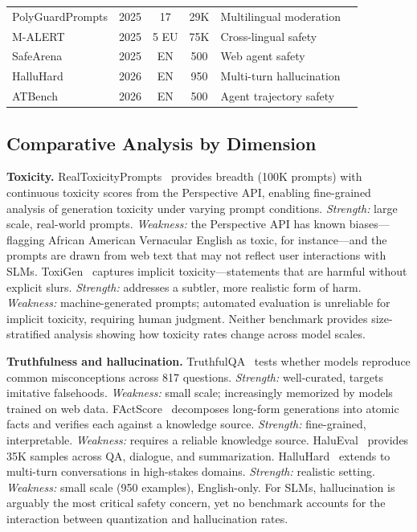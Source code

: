 \documentclass[12pt,a4paper]{article}
\begin{document}
\begin{table}[t]
\begin{tabular}{@{}llccll@{}}
PolyGuardPrompts & 2025 & 17 & 29K & Multilingual moderation & \citet{polyguard2025} \\
M-ALERT & 2025 & 5 EU & 75K & Cross-lingual safety & \citet{malert2025} \\
SafeArena & 2025 & EN & 500 & Web agent safety & \citet{safearena2025} \\
HalluHard & 2026 & EN & 950 & Multi-turn hallucination & \citet{halluhard2026} \\
ATBench & 2026 & EN & 500 & Agent trajectory safety & \citet{atbench2026} \\
\bottomrule
\end{tabular}
\end{table}

\subsection{Comparative Analysis by Dimension}

\textbf{Toxicity.} RealToxicityPrompts~\citep{gehman2020realtoxicity} provides breadth (100K prompts) with continuous toxicity scores from the Perspective API, enabling fine-grained analysis of generation toxicity under varying prompt conditions. \emph{Strength:} large scale, real-world prompts. \emph{Weakness:} the Perspective API has known biases---flagging African American Vernacular English as toxic, for instance---and the prompts are drawn from web text that may not reflect user interactions with SLMs. ToxiGen~\citep{hartvigsen2022toxigen} captures implicit toxicity---statements that are harmful without explicit slurs. \emph{Strength:} addresses a subtler, more realistic form of harm. \emph{Weakness:} machine-generated prompts; automated evaluation is unreliable for implicit toxicity, requiring human judgment. Neither benchmark provides size-stratified analysis showing how toxicity rates change across model scales.

\textbf{Truthfulness and hallucination.} TruthfulQA~\citep{lin2022truthfulqa} tests whether models reproduce common misconceptions across 817 questions. \emph{Strength:} well-curated, targets imitative falsehoods. \emph{Weakness:} small scale; increasingly memorized by models trained on web data. FActScore~\citep{min2023factscore} decomposes long-form generations into atomic facts and verifies each against a knowledge source. \emph{Strength:} fine-grained, interpretable. \emph{Weakness:} requires a reliable knowledge source. HaluEval~\citep{li2023halueval} provides 35K samples across QA, dialogue, and summarization. HalluHard~\citep{halluhard2026} extends to multi-turn conversations in high-stakes domains. \emph{Strength:} realistic setting. \emph{Weakness:} small scale (950 examples), English-only. For SLMs, hallucination is arguably the most critical safety concern, yet no benchmark accounts for the interaction between quantization and hallucination rates.
\end{document}
